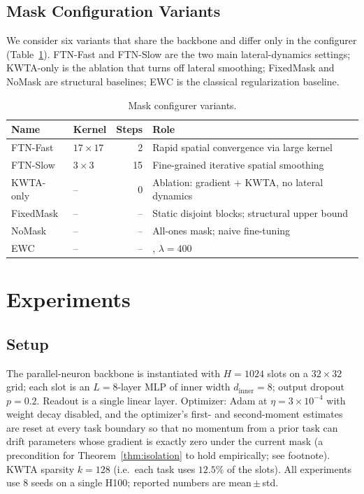 \documentclass{article}
\begin{document}
\subsection{Mask Configuration Variants}
\label{sec:variants}

We consider six variants that share the backbone and differ only in the configurer (Table~\ref{tab:variants}). FTN-Fast and FTN-Slow are the two main lateral-dynamics settings; KWTA-only is the ablation that turns off lateral smoothing; FixedMask and NoMask are structural baselines; EWC is the classical regularization baseline.

\begin{table}[ht]
\centering
\caption{Mask configurer variants.}
\label{tab:variants}
\begin{tabular}{llrl}
\toprule
Name & Kernel & Steps & Role \\
\midrule
FTN-Fast   & $17\times17$ & 2  & Rapid spatial convergence via large kernel \\
FTN-Slow   & $3\times3$   & 15 & Fine-grained iterative spatial smoothing \\
KWTA-only  & --           & 0  & Ablation: gradient + KWTA, no lateral dynamics \\
FixedMask  & --           & -- & Static disjoint blocks; structural upper bound \\
NoMask     & --           & -- & All-ones mask; naive fine-tuning \\
EWC        & --           & -- & \citep{kirkpatrick2017overcoming}, $\lambda=400$ \\
\bottomrule
\end{tabular}
\end{table}

\section{Experiments}
\label{sec:experiments}

\subsection{Setup}
\label{sec:setup}

The parallel-neuron backbone is instantiated with $H{=}1024$ slots on a $32{\times}32$ grid; each slot is an $L{=}8$-layer MLP of inner width $d_\mathrm{inner}{=}8$; output dropout $p{=}0.2$. Readout is a single linear layer. Optimizer: Adam at $\eta{=}3{\times}10^{-4}$ with weight decay disabled, and the optimizer's first- and second-moment estimates are reset at every task boundary so that no momentum from a prior task can drift parameters whose gradient is exactly zero under the current mask (a precondition for Theorem~\ref{thm:isolation} to hold empirically; see footnote). KWTA sparsity $k{=}128$ (i.e.\ each task uses $12.5\%$ of the slots). All experiments use 8 seeds on a single H100; reported numbers are mean\,$\pm$\,std.
\end{document}
